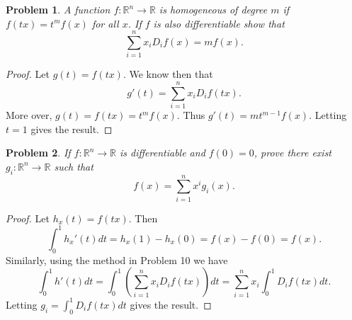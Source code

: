 \documentclass{article}
\newtheorem{problem}{Problem}
\begin{document}
\begin{flushleft}
\begin{problem}
A function $f : \mathbb{R}^n \rightarrow \mathbb{R}$ is homogeneous of degree $m$ if $f(tx) = t^m f(x)$ for all $x$. If $f$ is also differentiable show that
\[
\sum_{i=1}^n x_i D_if(x) = mf(x).
\]
\end{problem}
\begin{proof}
Let $g(t) = f(tx)$. We know then that
\[
g'(t) = \sum_{i=1}^n x_i D_i f(tx).
\]
More over, $g(t) = f(tx) = t^m f(x)$. Thus $g'(t) = m t^{m-1} f(x)$. Letting $t=1$ gives the result.
\end{proof}

\begin{problem}
If $f : \mathbb{R}^n \rightarrow \mathbb{R}$ is differentiable and $f(0) = 0$, prove there exist $g_i : \mathbb{R}^n \rightarrow \mathbb{R}$ such that
\[
f(x) = \sum_{i=1}^{n} x^i g_i(x).
\]
\end{problem}
\begin{proof}
Let $h_x(t) = f(tx)$. Then
\[
\int_0^1 h_x'(t) dt = h_x(1) - h_x(0) = f(x) - f(0) = f(x).
\]
Similarly, using the method in Problem 10 we have
\[
\int_0^1 h'(t) dt = \int_0^1 \left ( \sum_{i=1}^n x_i D_if(tx) \right ) dt = \sum_{i=1}^n x_i \int_0^1 D_i f(tx) dt.
\]
Letting $g_i = \int_0^1 D_i f(tx) dt$ gives the result.
\end{proof}

\end{flushleft}
\end{document}
